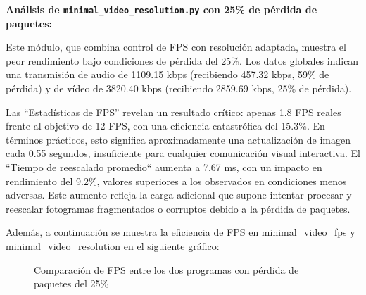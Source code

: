 \vspace{\baselineskip}

\textbf{Análisis de \texttt{minimal\_video\_resolution.py} con 25\% de pérdida de paquetes:}
\vspace{\baselineskip}

Este módulo, que combina control de FPS con resolución adaptada, muestra el peor rendimiento bajo condiciones de pérdida del 25\%. Los datos globales indican una transmisión de audio de 1109.15 kbps (recibiendo 457.32 kbps, 59\% de pérdida) y de vídeo de 3820.40 kbps (recibiendo 2859.69 kbps, 25\% de pérdida).

Las ``Estadísticas de FPS'' revelan un resultado crítico: apenas 1.8 FPS reales frente al objetivo de 12 FPS, con una eficiencia catastrófica del 15.3\%. En términos prácticos, esto significa aproximadamente una actualización de imagen cada 0.55 segundos, insuficiente para cualquier comunicación visual interactiva. El ``Tiempo de reescalado promedio`` aumenta a 7.67 ms, con un impacto en rendimiento del 9.2\%, valores superiores a los observados en condiciones menos adversas. Este aumento refleja la carga adicional que supone intentar procesar y reescalar fotogramas fragmentados o corruptos debido a la pérdida de paquetes.

\vspace{\baselineskip}

Además, a continuación se muestra la eficiencia de FPS en minimal\_video\_fps y minimal\_video\_resolution en el siguiente gráfico:
\begin{figure}[H]
\centering
{}
\caption{Comparación de FPS entre los dos programas con pérdida de paquetes del 25\%}
\label{fig:comparacionfps_25pct}
\end{figure}

